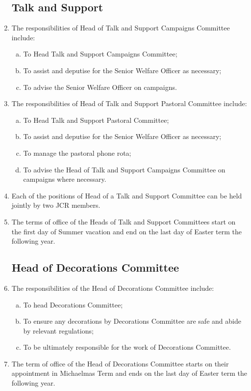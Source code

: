 \documentclass[12pt]{article}
\begin{document}
\begin{enumerate}
    \subsection{Talk and Support}
    \item The responsibilities of Head of Talk and Support Campaigns Committee include:
    \begin{enumerate}[(a)]
        \item To Head Talk and Support Campaigns Committee;
        \item To assist and deputise for the Senior Welfare Officer as necessary;
        \item To advise the Senior Welfare Officer on campaigns.
    \end{enumerate}
    \item The responsibilities of Head of Talk and Support Pastoral Committee include:
    \begin{enumerate}[(a)]
        \item To Head Talk and Support Pastoral Committee;
        \item To assist and deputise for the Senior Welfare Officer as necessary;
        \item To manage the pastoral phone rota;
        \item To advise the Head of Talk and Support Campaigns Committee on campaigns where necessary.
    \end{enumerate}
    \item Each of the positions of Head of a Talk and Support Committee can be held jointly by two JCR members.
    \item The terms of office of the Heads of Talk and Support Committees start on the first day of Summer vacation and end on the last day of Easter term the following year.
    \subsection{Head of Decorations Committee}
    \item The responsibilities of the Head of Decorations Committee include:
    \begin{enumerate}[(a)]
        \item To head Decorations Committee;
        \item To ensure any decorations by Decorations Committee are safe and abide by relevant regulations;
        \item To be ultimately responsible for the work of Decorations Committee.
    \end{enumerate}
    \item The term of office of the Head of Decorations Committee starts on their appointment in Michaelmas Term and ends on the last day of Easter term the following year.

\end{enumerate}
\end{document}
